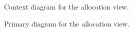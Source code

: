 \documentclass[a4paper,10pt]{article}
\begin{document}
\begin{figure}[!htp]
    \centering
    \caption{Context diagram for the allocation view.}\label{fig:depl_context}
\end{figure}

\begin{figure}[!htp]
    \centering
    \caption{Primary diagram for the allocation view.}\label{fig:depl_main}
\end{figure}
\end{document}
